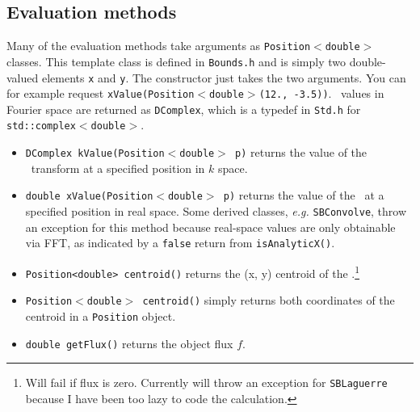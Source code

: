 \documentclass[11pt,preprint,flushrt]{aastex}
\begin{document}
\subsection{Evaluation methods}
Many of the evaluation methods take arguments as {\tt Position$<$double$>$} classes.  This template class is defined in {\tt Bounds.h} and is simply two double-valued elements {\tt x} and {\tt y}.  The constructor just takes the two arguments.  You can for example request {\tt xValue(Position$<$double$>$(12., -3.5))}.  \sbp\ values in Fourier space are returned as {\tt DComplex}, which is a typedef in {\tt Std.h} for {\tt std::complex$<$double$>$}.

\begin{itemize}
\item {\tt DComplex kValue(Position$<$double$>$ p)} returns the value of the \sbp\ transform at a specified position in $k$ space.
\item {\tt double xValue(Position$<$double$>$ p)} returns the value of the \sbp\ at a specified position in real space.  Some derived classes, {\it e.g.} {\tt SBConvolve}, throw an exception for this method because real-space values are only obtainable via FFT, as indicated by a {\tt false} return from {\tt isAnalyticX()}.
\item {\tt  Position<double> centroid()} returns the (x, y) centroid of the \sbp.\footnote{Will fail if flux is zero.  Currently will throw an exception for {\tt SBLaguerre} because I have been too lazy to code the calculation.}
\item {\tt  Position$<$double$>$ centroid()} simply returns both coordinates of the centroid in a {\tt Position} object.
\item {\tt double getFlux()} returns the object flux $f$.
\end{itemize}
\end{document}
